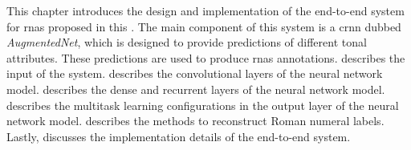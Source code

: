 

This chapter introduces the design and implementation of the
end-to-end system for \glspl{rna} proposed in this
\thesisdiss{}. The main component of this system is a
\gls{crnn} dubbed \emph{AugmentedNet}, which is designed to
provide predictions of different tonal attributes. These
predictions are used to produce \glspl{rna} annotations.
 describes the input of the system.
 describes the
convolutional layers of the neural network model.
 describes the dense and
recurrent layers of the neural network model.
 describes the
multitask learning configurations in the output layer of the
neural network model. 
describes the methods to reconstruct Roman numeral labels.
Lastly,  discusses the implementation
details of the end-to-end system.
